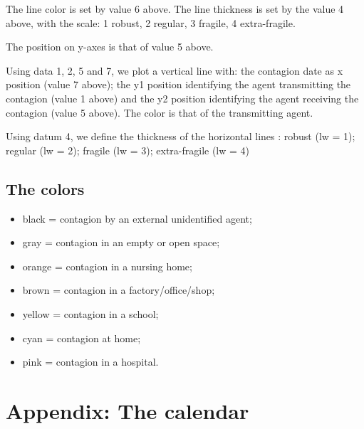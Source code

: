\documentclass[11pt]{article}
\begin{document}
The line color is set by value 6 above. The line thickness is set by the value 4 above, with the scale: 1 robust, 2 regular, 3 fragile, 4 extra-fragile.

The position on y-axes is that of value 5 above. 

Using data 1, 2, 5 and 7, we plot a vertical line with: the contagion date as x position (value 7 above); the y1 position identifying the agent transmitting the contagion (value 1 above) and the y2 position identifying the agent receiving the contagion (value 5 above). The color is that of the transmitting agent.

Using  datum 4, we define the thickness of the horizontal lines : robust (lw = 1); regular (lw = 2); fragile (lw = 3); extra-fragile (lw = 4)

\subsection{The colors}
\begin{itemize}
\setlength{\itemsep}{0pt}
\item   black = contagion by an external unidentified agent;
\item    gray =  contagion in an empty or open space;
\item    orange = contagion in a nursing home;
\item    brown = contagion in a factory/office/shop;
\item    yellow = contagion in a school;
\item    cyan = contagion at home;
\item    pink = contagion in a hospital.
\end{itemize}


\section{Appendix: The calendar}
\label{appCalendar}
\end{document}
